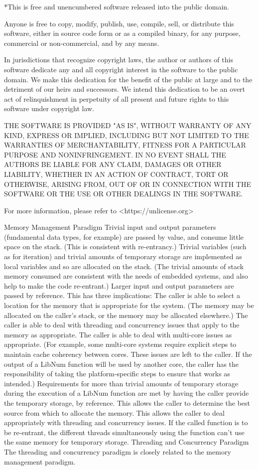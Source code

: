 *This is free and unencumbered software released into the public domain.

Anyone is free to copy, modify, publish, use, compile, sell, or
distribute this software, either in source code form or as a compiled
binary, for any purpose, commercial or non-commercial, and by any
means.

In jurisdictions that recognize copyright laws, the author or authors
of this software dedicate any and all copyright interest in the
software to the public domain. We make this dedication for the benefit
of the public at large and to the detriment of our heirs and
successors. We intend this dedication to be an overt act of
relinquishment in perpetuity of all present and future rights to this
software under copyright law.

THE SOFTWARE IS PROVIDED "AS IS", WITHOUT WARRANTY OF ANY KIND,
EXPRESS OR IMPLIED, INCLUDING BUT NOT LIMITED TO THE WARRANTIES OF
MERCHANTABILITY, FITNESS FOR A PARTICULAR PURPOSE AND NONINFRINGEMENT.
IN NO EVENT SHALL THE AUTHORS BE LIABLE FOR ANY CLAIM, DAMAGES OR
OTHER LIABILITY, WHETHER IN AN ACTION OF CONTRACT, TORT OR OTHERWISE,
ARISING FROM, OUT OF OR IN CONNECTION WITH THE SOFTWARE OR THE USE OR
OTHER DEALINGS IN THE SOFTWARE.

For more information, please refer to <https://unlicense.org>

Memory Management Paradigm
Trivial input and output parameters (fundamental data types, for example) are passed by value, and consume little space on the stack. (This is consistent with re-entrancy.)
Trivial variables (such as for iteration) and trivial amounts of temporary storage are implemented as local variables and so are allocated on the stack. (The trivial amounts of stack memory consumed are consistent with the needs of embedded systems, and also help to make the code re-entrant.)
Larger input and output parameters are passed by reference. This has three implications:
The caller is able to select a location for the memory that is appropriate for the system. (The memory may be allocated on the caller's stack, or the memory may be allocated elsewhere.)
The caller is able to deal with threading and concurrency issues that apply to the memory as appropriate.
The caller is able to deal with multi-core issues as appropriate. (For example, some multi-core systems require explicit steps to maintain cache coherency between cores. These issues are left to the caller. If the output of a LibNum function will be used by another core, the caller has the responsibility of taking the platform-specific steps to ensure that works as intended.)
Requirements for more than trivial amounts of temporary storage during the execution of a LibNum function are met by having the caller provide the temporary storage, by reference.
This allows the caller to determine the best source from which to allocate the memory.
This allows the caller to deal appropriately with threading and concurrency issues. If the called function is to be re-entrant, the different threads simultaneously using the function can't use the same memory for temporary storage.
Threading and Concurrency Paradigm
The threading and concurrency paradigm is closely related to the memory management paradigm.

